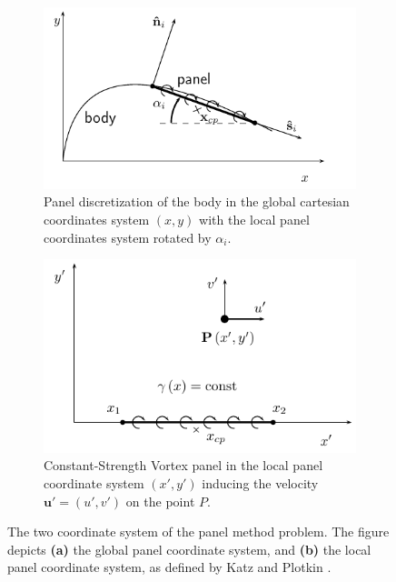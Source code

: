 	\begin{figure}[!b]
        \centering
        \begin{subfigure}[b]{0.45\textwidth}
                \includegraphics[width=\textwidth]{figures/lagrangian/panelCoordinateDefinition.pdf}
                \caption{Panel discretization of the body in the global cartesian coordinates system $\left(x,y\right)$ with the local panel coordinates system rotated by $\alpha_i$.}
                \label{fig:panelCoordinateDefinition}
        \end{subfigure}%
        \qquad %
        \begin{subfigure}[b]{0.45\textwidth}
                \includegraphics[width=\textwidth]{figures/lagrangian/vortexPanelDefinition.pdf}
                \caption{Constant-Strength Vortex panel in the local panel coordinate system $\left(x',y'\right)$ inducing the velocity $\mathbf{u}'=(u',v')$ on the point $P$.}
                \label{fig:vortexPanelDefinition}
        \end{subfigure}
        \caption{The two coordinate system of the panel method problem. The figure depicts \textbf{(a)} the global panel coordinate system, and \textbf{(b)} the local panel coordinate system, as defined by Katz and Plotkin \cite{Katz2001a}.}
        \label{fig:panelDefinitions}
	\end{figure}	
	
